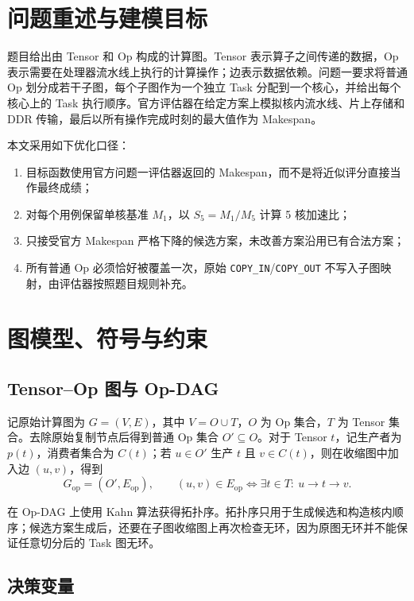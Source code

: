\section{问题重述与建模目标}

题目给出由 Tensor 和 Op 构成的计算图。Tensor 表示算子之间传递的数据，Op 表示需要在处理器流水线上执行的计算操作；边表示数据依赖。问题一要求将普通 Op 划分成若干子图，每个子图作为一个独立 Task 分配到一个核心，并给出每个核心上的 Task 执行顺序。官方评估器在给定方案上模拟核内流水线、片上存储和 DDR 传输，最后以所有操作完成时刻的最大值作为 Makespan。

本文采用如下优化口径：
\begin{enumerate}
  \item 目标函数使用官方问题一评估器返回的 Makespan，而不是将近似评分直接当作最终成绩；
  \item 对每个用例保留单核基准 $M_1$，以 $S_5=M_1/M_5$ 计算 5 核加速比；
  \item 只接受官方 Makespan 严格下降的候选方案，未改善方案沿用已有合法方案；
  \item 所有普通 Op 必须恰好被覆盖一次，原始 \texttt{COPY\_IN}/\texttt{COPY\_OUT} 不写入子图映射，由评估器按照题目规则补充。
\end{enumerate}

\section{图模型、符号与约束}

\subsection{Tensor--Op 图与 Op-DAG}

记原始计算图为 $G=(V,E)$，其中 $V=O\cup T$，$O$ 为 Op 集合，$T$ 为 Tensor 集合。去除原始复制节点后得到普通 Op 集合 $O'\subseteq O$。对于 Tensor $t$，记生产者为 $p(t)$，消费者集合为 $C(t)$；若 $u\in O'$ 生产 $t$ 且 $v\in C(t)$，则在收缩图中加入边 $(u,v)$，得到
\begin{equation}
G_{\mathrm{op}}=(O',E_{\mathrm{op}}),\qquad
(u,v)\in E_{\mathrm{op}}\Longleftrightarrow
\exists t\in T:\ u\to t\to v .
\end{equation}

在 Op-DAG 上使用 Kahn 算法获得拓扑序。拓扑序只用于生成候选和构造核内顺序；候选方案生成后，还要在子图收缩图上再次检查无环，因为原图无环并不能保证任意切分后的 Task 图无环。

\subsection{决策变量}

